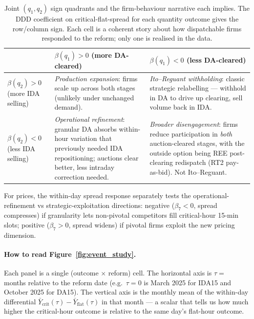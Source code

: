\documentclass[11pt,a4paper]{article}
\begin{document}
\begin{table}[H]
\centering\footnotesize
\setlength{\tabcolsep}{6pt}
\caption{Joint $(q_1, q_2)$ sign quadrants and the firm-behaviour narrative each implies. The DDD coefficient on critical-flat-spread for each quantity outcome gives the row/column sign. Each cell is a coherent story about how dispatchable firms responded to the reform; only one is realised in the data.}
\label{tab:reform_outcomes}
\begin{tabular}{@{}p{2.6cm} p{5.5cm} p{5.5cm}@{}}
\toprule
 & $\beta(q_1) > 0$ (more DA-cleared) & $\beta(q_1) < 0$ (less DA-cleared) \\
\midrule
$\beta(q_2) > 0$ (more IDA selling) & \emph{Production expansion}: firms scale up across both stages (unlikely under unchanged demand). & \emph{Ito--Reguant withholding}: classic strategic relabelling --- withhold in DA to drive up clearing, sell volume back in IDA. \\
\addlinespace
$\beta(q_2) < 0$ (less IDA selling) & \emph{Operational refinement}: granular DA absorbs within-hour variation that previously needed IDA repositioning; auctions clear better, less intraday correction needed. & \emph{Broader disengagement}: firms reduce participation in \emph{both} auction-cleared stages, with the outside option being REE post-clearing redispatch (RT2 pay-as-bid). Not Ito--Reguant. \\
\bottomrule
\end{tabular}
\end{table}

\noindent For prices, the within-day spread response separately tests the operational-refinement vs strategic-exploitation directions: negative ($\beta_7 < 0$, spread compresses) if granularity lets non-pivotal competitors fill critical-hour 15-min slots; positive ($\beta_7 > 0$, spread widens) if pivotal firms exploit the new pricing dimension.

\paragraph{How to read Figure~\ref{fig:event_study}.}
Each panel is a single (outcome $\times$ reform) cell. The horizontal axis is $\tau =$ months relative to the reform date (e.g.\ $\tau = 0$ is March 2025 for IDA15 and October 2025 for DA15). The vertical axis is the monthly mean of the within-day differential $\bar Y_{\text{crit}}(\tau) - \bar Y_{\text{flat}}(\tau)$ in that month --- a scalar that tells us how much higher the critical-hour outcome is relative to the same day's flat-hour outcome.
\end{document}
